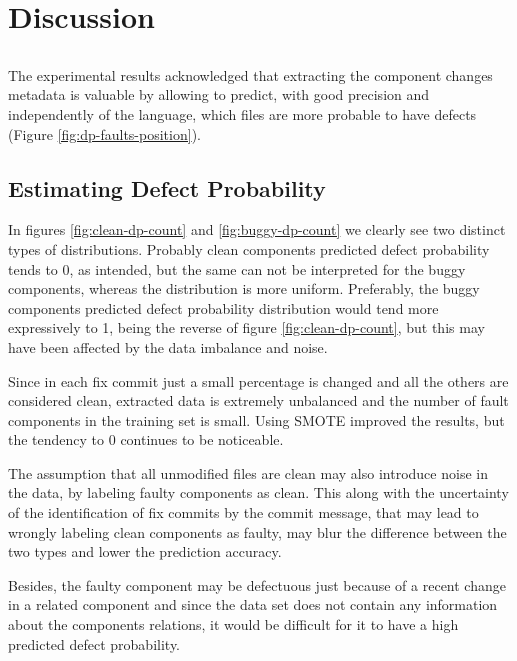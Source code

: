 \chapter{Discussion} \label{chap:discussion}

\section*{}

The experimental results acknowledged that extracting the component changes metadata is valuable by allowing to predict, with good precision and independently of the language, which files are more probable to have defects (Figure \ref{fig:dp-faults-position}).

\section{Estimating Defect Probability}

In figures \ref{fig:clean-dp-count} and \ref{fig:buggy-dp-count} we clearly see two distinct types of distributions. 
Probably clean components predicted defect probability tends to $0$, as intended, but the same can not be interpreted for the buggy components, whereas the distribution is more uniform. Preferably, the buggy components predicted defect probability distribution would tend more expressively to 1, being the reverse of figure \ref{fig:clean-dp-count}, but this may have been affected by the data imbalance and noise.

Since in each fix commit just a small percentage is changed and all the others are considered clean, extracted data is extremely unbalanced and the number of fault components in the training set is small. Using SMOTE improved the results, but the tendency to $0$ continues to be noticeable.

The assumption that all unmodified files are clean may also introduce noise in the data, by labeling faulty components as clean. This along with the uncertainty of the identification of fix commits by the commit message, that may lead to wrongly labeling clean components as faulty, may blur the difference between the two types and lower the prediction accuracy.

Besides, the faulty component may be defectuous just because of a recent change in a related component and since the data set does not contain any information about the components relations, it would be difficult for it to have a high predicted defect probability.

